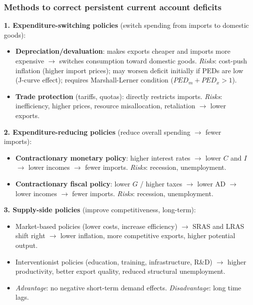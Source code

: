 \subsubsection*{Methods to correct persistent current account deficits}
\textbf{1. Expenditure-switching policies} (switch spending from imports to domestic goods):
\begin{itemize}
  \item \textbf{Depreciation/devaluation}: makes exports cheaper and imports more expensive $\to$ switches consumption toward domestic goods. \textit{Risks}: cost-push inflation (higher import prices); may worsen deficit initially if PEDs are low (J-curve effect); requires Marshall-Lerner condition ($PED_m + PED_x > 1$).
  \item \textbf{Trade protection} (tariffs, quotas): directly restricts imports. \textit{Risks}: inefficiency, higher prices, resource misallocation, retaliation $\to$ lower exports.
\end{itemize}
\textbf{2. Expenditure-reducing policies} (reduce overall spending $\to$ fewer imports):
\begin{itemize}
  \item \textbf{Contractionary monetary policy}: higher interest rates $\to$ lower $C$ and $I$ $\to$ lower incomes $\to$ fewer imports. \textit{Risks}: recession, unemployment.
  \item \textbf{Contractionary fiscal policy}: lower $G$ / higher taxes $\to$ lower AD $\to$ lower incomes $\to$ fewer imports. \textit{Risks}: recession, unemployment.
\end{itemize}
\textbf{3. Supply-side policies} (improve competitiveness, long-term):
\begin{itemize}
  \item Market-based policies (lower costs, increase efficiency) $\to$ SRAS and LRAS shift right $\to$ lower inflation, more competitive exports, higher potential output.
  \item Interventionist policies (education, training, infrastructure, R\&D) $\to$ higher productivity, better export quality, reduced structural unemployment.
  \item \textit{Advantage}: no negative short-term demand effects. \textit{Disadvantage}: long time lags.
\end{itemize}

